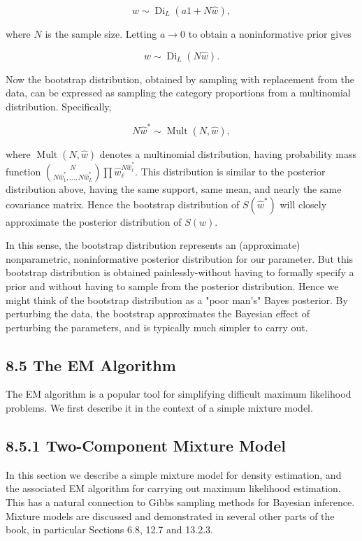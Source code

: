 \documentclass[10pt]{article}
\begin{document}
\begin{equation*}
w \sim \operatorname{Di}_{L}(a 1+N \hat{w}), \tag{8.33}
\end{equation*}


where $N$ is the sample size. Letting $a \rightarrow 0$ to obtain a noninformative prior gives


\begin{equation*}
w \sim \operatorname{Di}_{L}(N \hat{w}) . \tag{8.34}
\end{equation*}


Now the bootstrap distribution, obtained by sampling with replacement from the data, can be expressed as sampling the category proportions from a multinomial distribution. Specifically,


\begin{equation*}
N \hat{w}^{*} \sim \operatorname{Mult}(N, \hat{w}), \tag{8.35}
\end{equation*}


where $\operatorname{Mult}(N, \hat{w})$ denotes a multinomial distribution, having probability mass function $\binom{N}{N \hat{w}_{1}^{*}, \ldots, N \hat{w}_{L}^{*}} \prod \hat{w}_{\ell}^{N \hat{w}_{\ell}^{*}}$. This distribution is similar to the posterior distribution above, having the same support, same mean, and nearly the same covariance matrix. Hence the bootstrap distribution of $S\left(\hat{w}^{*}\right)$ will closely approximate the posterior distribution of $S(w)$.

In this sense, the bootstrap distribution represents an (approximate) nonparametric, noninformative posterior distribution for our parameter. But this bootstrap distribution is obtained painlessly-without having to formally specify a prior and without having to sample from the posterior distribution. Hence we might think of the bootstrap distribution as a "poor man's" Bayes posterior. By perturbing the data, the bootstrap approximates the Bayesian effect of perturbing the parameters, and is typically much simpler to carry out.

\subsection*{8.5 The EM Algorithm}
The EM algorithm is a popular tool for simplifying difficult maximum likelihood problems. We first describe it in the context of a simple mixture model.

\subsection*{8.5.1 Two-Component Mixture Model}
In this section we describe a simple mixture model for density estimation, and the associated EM algorithm for carrying out maximum likelihood estimation. This has a natural connection to Gibbs sampling methods for Bayesian inference. Mixture models are discussed and demonstrated in several other parts of the book, in particular Sections 6.8, 12.7 and 13.2.3.
\end{document}
